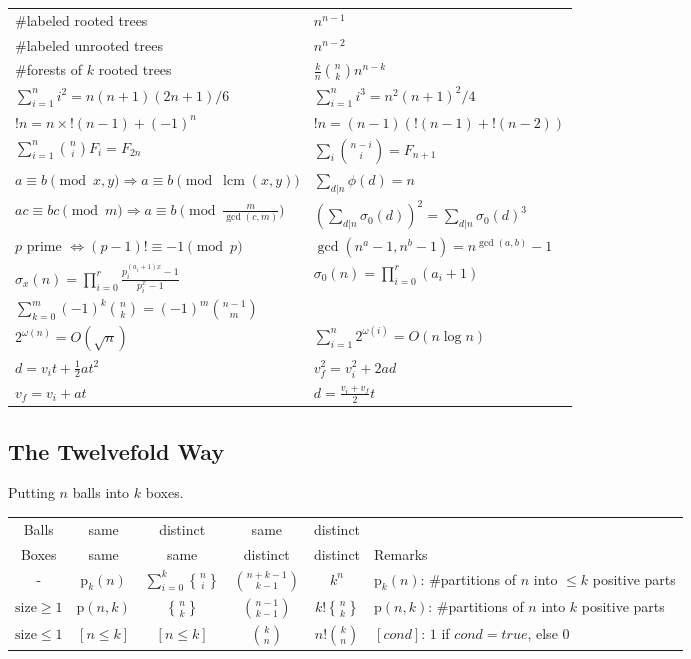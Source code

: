 \documentclass[12pt,a4paper,landscape]{amsart}
\DeclareMathOperator{\lcm}{lcm}
\DeclareRobustCommand{\stirling}{\genfrac\{\}{0pt}{}}
\begin{document}
\begin{multicols*}{3}
	\vspace{10pt}
	\begin{tabular}{ll}
		\#labeled rooted trees & $n^{n-1}$ \\
		\#labeled unrooted trees & $n^{n-2}$ \\
		\#forests of $k$ rooted trees & $\frac{k}{n}\binom{n}{k}n^{n-k}$ \\
		$\sum_{i=1}^n i^2 = n(n+1)(2n+1)/6$ & $\sum_{i=1}^n i^3 = n^2(n+1)^2/4$ \\
		$!n = n\times!(n-1)+(-1)^n$ & $!n = (n-1)(!(n-1)+!(n-2))$ \\
		$\sum_{i=1}^n \binom{n}{i} F_i = F_{2n}$ & $\sum_{i} \binom{n-i}{i} = F_{n+1}$ \\
		$a \equiv b \pmod{x,y} \Rightarrow a \equiv b \pmod{\lcm(x, y)}$ & $\sum_{d|n} \phi(d) = n$ \\
		$ac\equiv bc\pmod{m} \Rightarrow a\equiv b\pmod{\frac{m}{\gcd(c,m)}}$ & $(\sum_{d|n} \sigma_0(d))^2 = \sum_{d|n} \sigma_0(d)^3$ \\
		$p$ prime $\Leftrightarrow (p-1)!\equiv -1\pmod{p}$ & $\gcd(n^a-1,n^b-1) = n^{\gcd(a,b)}-1$ \\
		$\sigma_x(n) = \prod_{i=0}^{r} \frac{p_i^{(a_i + 1)x} - 1}{p_i^x - 1}$ & $\sigma_0(n) = \prod_{i=0}^r (a_i + 1)$ \\
		$\sum_{k=0}^m (-1)^k \binom{n}{k} = (-1)^m \binom{n-1}{m}$ & \\
		$2^{\omega(n)} = O(\sqrt{n})$ & $\sum_{i=1}^n 2^{\omega(i)} = O(n \log n)$ \\
		$d = v_i t + \frac{1}{2}at^2$ & $v_f^2 = v_i^2 + 2ad$ \\
		$v_f = v_i + at$ & $d = \frac{v_i + v_f}{2}t$ \\
	\end{tabular}

	\subsection{The Twelvefold Way}
	Putting $n$ balls into $k$ boxes.\\
	\begin{tabular}{@{}c|c|c|c|c|l@{}}
		Balls & same & distinct & same & distinct & \\
		Boxes & same & same & distinct & distinct & Remarks\\
		\hline
		- & $\mathrm{p}_k(n)$ & $\sum_{i=0}^k \stirling{n}{i}$ & $\binom{n+k-1}{k-1}$ & $k^n$ & $\mathrm{p}_k(n)$: \#partitions of $n$ into $\le k$ positive parts \\
		$\mathrm{size}\ge 1$ & $\mathrm{p}(n,k)$ & $\stirling{n}{k}$ & $\binom{n-1}{k-1}$ & $k!\stirling{n}{k}$ & $\mathrm{p}(n,k)$: \#partitions of $n$ into $k$ positive parts \\
		$\mathrm{size}\le 1$ & $[n \le k]$ & $[n \le k]$ & $\binom{k}{n}$ & $n!\binom{k}{n}$ & $[cond]$: $1$ if $cond=true$, else $0$\\
		\bottomrule
	\end{tabular}



\end{multicols*}
\end{document}
